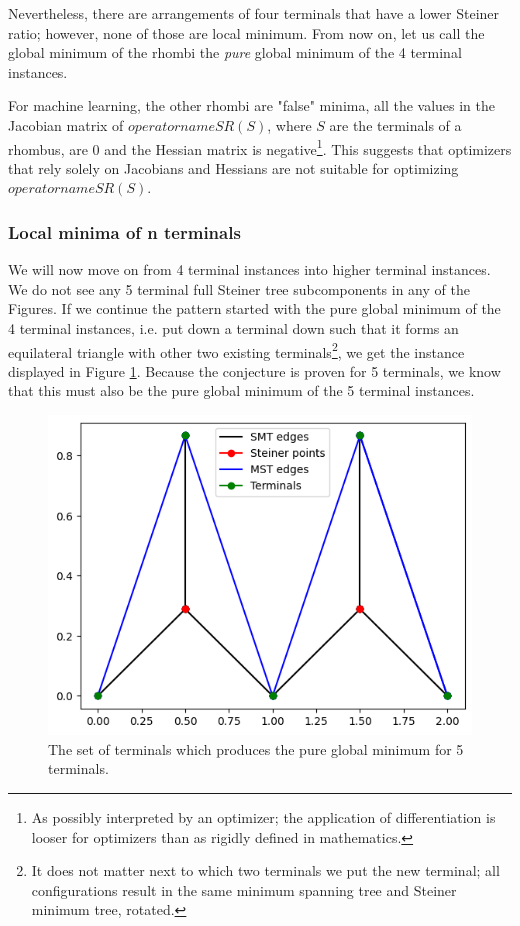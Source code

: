 \documentclass{mpaper}
\begin{document}
Nevertheless, there are arrangements of four terminals that have a lower Steiner ratio; however, none of those are local minimum. From now on, let us call the global minimum of the rhombi the  \emph{pure} global minimum of the 4 terminal instances. 

For machine learning, the other rhombi are "false" minima, all the values in the Jacobian matrix of $operatorname{SR}(S)$, where $S$ are the terminals of a rhombus, are 0 and the Hessian matrix is negative\footnote{As possibly interpreted by an optimizer; the application of differentiation is looser for optimizers than as rigidly defined in mathematics.}. This suggests that optimizers that rely solely on Jacobians and Hessians are not suitable for optimizing $operatorname{SR}(S)$.

\subsubsection{Local minima of n terminals}
We will now move on from 4 terminal instances into higher terminal instances. We do not see any 5 terminal full Steiner tree subcomponents in any of the Figures. If we continue the pattern started with the pure global minimum of the 4 terminal instances, i.e. put down a terminal down such that it forms an equilateral triangle with other two existing terminals\footnote{It does not matter next to which two terminals we put the new terminal; all configurations result in the same minimum spanning tree and Steiner minimum tree, rotated.}, we get the instance displayed in Figure \ref{fig:13}. Because the conjecture is proven for 5 terminals, we know that this must also be the pure global minimum of the 5 terminal instances.

\begin{figure}[h!]
  \begin{center}
  \includegraphics[scale=0.5]{plot12.png}
  \end{center}
  \caption{\label{fig:13} The set of terminals which produces the pure global minimum for 5 terminals.}
\end{figure}
\end{document}
